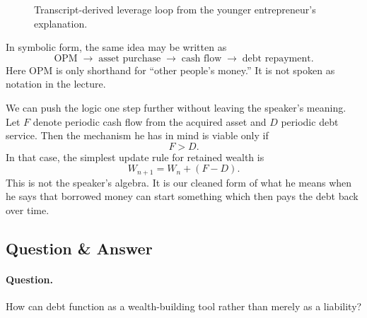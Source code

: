 \begin{figure}[h]
\centering
{}
\caption{Transcript-derived leverage loop from the younger entrepreneur's explanation.}
\end{figure}

In symbolic form, the same idea may be written as
\begin{equation}
\text{OPM}
\;\to\;
\text{asset purchase}
\;\to\;
\text{cash flow}
\;\to\;
\text{debt repayment}.
\end{equation}
Here \(\text{OPM}\) is only shorthand for ``other people's money.'' It is not spoken as notation in the lecture.

We can push the logic one step further without leaving the speaker's meaning. Let \(F\) denote periodic cash flow from the acquired asset and \(D\) periodic debt service. Then the mechanism he has in mind is viable only if
\begin{equation}
F>D.
\end{equation}
In that case, the simplest update rule for retained wealth is
\begin{equation}
W_{n+1}=W_n + (F-D).
\end{equation}
This is not the speaker's algebra. It is our cleaned form of what he means when he says that borrowed money can start something which then pays the debt back over time.

\subsection{Question \& Answer}

\paragraph{Question.} How can debt function as a wealth-building tool rather than merely as a liability?


